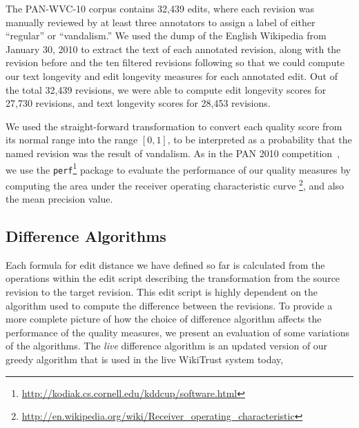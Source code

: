 The PAN-WVC-10 corpus contains 32,439 edits, where each revision was
manually reviewed by at least three annotators to assign a label
of either ``regular'' or ``vandalism.''
We used the dump of the English Wikipedia from January 30, 2010
to extract the text of each annotated revision, along with the revision
before and the ten filtered revisions following so that we could compute
our text longevity and edit longevity measures for each annotated edit.
Out of the total 32,439 revisions, we were able to compute
edit longevity scores for 27,730 revisions, and text longevity
scores for 28,453 revisions.

We used the straight-forward transformation to convert
each quality score from its normal range into the range
$[0,1]$, to be interpreted as a probability that the named
revision was the result of vandalism.
As in the PAN 2010 competition~\cite{Potthast2010b}, we use the
\texttt{perf}\footnote{\url{http://kodiak.cs.cornell.edu/kddcup/software.html}}
package to evaluate the performance of our quality measures
by computing the area under the receiver operating characteristic
curve \footnote{\url{http://en.wikipedia.org/wiki/Receiver_operating_characteristic}},
and also the mean precision value.

\subsection{Difference Algorithms}

Each formula for edit distance we have defined so far is calculated
from the operations within the edit script describing the transformation
from the source revision to the target revision.
This edit script is highly dependent on the algorithm used to
compute the difference between the revisions.
To provide a more complete picture of how the choice of difference
algorithm affects the performance of the quality measures,
we present an evaluation of some variations of the algorithms.
The \textit{live} difference algorithm is an updated version of
our greedy algorithm that is used in the live WikiTrust system today,

